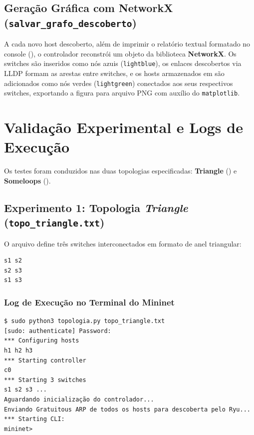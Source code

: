 \documentclass[12pt,a4paper]{article}
\begin{document}
\subsection{Geração Gráfica com NetworkX (\texttt{salvar\_grafo\_descoberto})}

A cada novo host descoberto, além de imprimir o relatório textual formatado no console (), o controlador reconstrói um objeto  da biblioteca \textbf{NetworkX}. Os switches são inseridos como nós azuis (\texttt{lightblue}), os enlaces descobertos via LLDP formam as arestas entre switches, e os hosts armazenados em  são adicionados como nós verdes (\texttt{lightgreen}) conectados aos seus respectivos switches, exportando a figura para arquivo PNG com auxílio do \texttt{matplotlib}.

\section{Validação Experimental e Logs de Execução}

Os testes foram conduzidos nas duas topologias especificadas: \textbf{Triangle} () e \textbf{Someloops} ().

\subsection{Experimento 1: Topologia \textit{Triangle} (\texttt{topo\_triangle.txt})}

O arquivo  define três switches interconectados em formato de anel triangular:
\begin{lstlisting}[caption={Conteudo do arquivo topo\_triangle.txt}]
s1 s2
s2 s3
s1 s3
\end{lstlisting}

\subsubsection{Log de Execução no Terminal do Mininet}
\begin{lstlisting}[caption={Saida do terminal do Mininet para a topologia Triangle}]
$ sudo python3 topologia.py topo_triangle.txt
[sudo: authenticate] Password:         
*** Configuring hosts
h1 h2 h3 
*** Starting controller
c0 
*** Starting 3 switches
s1 s2 s3 ...
Aguardando inicialização do controlador...
Enviando Gratuitous ARP de todos os hosts para descoberta pelo Ryu...
*** Starting CLI:
mininet> 
\end{lstlisting}
\end{document}
